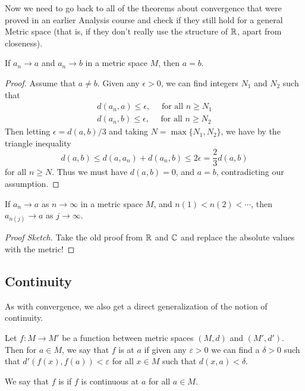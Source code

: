 \documentclass[a4paper]{scrartcl}
\begin{document}
Now we need to go back to all of the theorems about convergence that were proved in an earlier Analysis course and check if they still hold for a general Metric space (that is, if they don't really use the structure of $\mathbb{R}$, apart from closeness).

\begin{lemma}
    If $a_n \rightarrow a$ and $a_n \rightarrow b$ in a metric space $M$, then $a = b$.
\end{lemma}
\begin{proof}
	Assume that $a \neq b$. Given any $\epsilon > 0$, we can find integers $N_1$ and $N_2$ such that
	\begin{align*}
		d(a_n, a) \leq \epsilon, \quad \text{ for all $n \geq N_1$}\\
		d(a_n, b) \leq \epsilon, \quad \text{ for all $n \geq N_2$}
	\end{align*}
	Then letting $\epsilon = d(a, b)/3$ and taking $N = \max\{N_1, N_2\}$, we have by the triangle inequality
	$$
	d(a, b) \leq d(a, a_n) + d(a_n, b) \leq 2\epsilon = \frac{2}{3} d(a, b)
	$$
	for all $n \geq N$.
	Thus we must have $d(a, b) = 0$, and $a = b$, contradicting our assumption.
\end{proof}

\begin{lemma}
    If $a_n \rightarrow a$ as $n \rightarrow \infty$ in a metric space $M$, and $n(1) < n(2) < \cdots$, then $a_{n(j)} \rightarrow a$ as $j \rightarrow \infty$.
\end{lemma}
\begin{proof}[Proof Sketch]
    Take the old proof from $\mathbb{R}$ and $\mathbb{C}$ and replace the absolute values with the metric!
\end{proof}

\subsection{Continuity}

As with convergence, we also get a direct generalization of the notion of continuity.

\begin{definition}[Continuity]
    Let $f: M \rightarrow M'$ be a function between metric spaces $(M, d)$ and $(M', d')$. Then for $a \in M$, we say that $f$ is  at $a$ if given any $\varepsilon > 0$ we can find a $\delta > 0$ such that $d'(f(x), f(a)) < \varepsilon$ for all $x \in M$ such that $d(x, a) < \delta$.

    We say that $f$ is  if $f$ is continuous at $a$ for all $a \in M$.
\end{definition}
\end{document}
